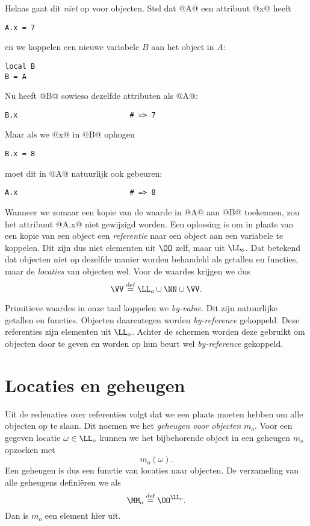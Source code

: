 Helaas gaat dit \emph{niet} op voor objecten. Stel dat @A@ een attribuut @x@ heeft
\begin{lstlisting}
A.x = 7
\end{lstlisting}
en we koppelen een nieuwe variabele $B$ aan het object in $A$:
\begin{lstlisting}
local B
B = A
\end{lstlisting}
Nu heeft @B@ sowieso dezelfde attributen als @A@:
\begin{lstlisting}
B.x                          # => 7
\end{lstlisting}
Maar als we @x@ in @B@ ophogen
\begin{lstlisting}
B.x = 8
\end{lstlisting}
moet dit in @A@ natuurlijk ook gebeuren:
\begin{lstlisting}
A.x                          # => 8
\end{lstlisting}
Wanneer we zomaar een kopie van de waarde in @A@ aan @B@ toekennen, zou het attribuut @A.x@ niet gewijzigd worden. Een oplossing is om in plaats van een kopie van een object een \emph{referentie} naar een object aan een variabele te koppelen. Dit zijn dus niet elementen uit $\OO$ zelf, maar uit $\LL_o$. Dat betekend dat objecten niet op dezelfde manier worden behandeld als getallen en functies, maar de \emph{locaties} van objecten wel. Voor de waardes krijgen we dus
\begin{equation*}
  \VV \DEF \LL_o \cup \NN \cup \VV.
\end{equation*}

Primitieve waardes in onze taal koppelen we \emph{by-value}. Dit zijn natuurlijke getallen en functies. Objecten daarentegen worden \emph{by-reference} gekoppeld. Deze referenties zijn elementen uit $\LL_o$. Achter de schermen worden deze gebruikt om objecten door te geven en worden op hun beurt wel \emph{by-reference} gekoppeld.

\section{Locaties en geheugen}\label{sec:locaties}

Uit de redenaties over referenties volgt dat we een plaats moeten hebben om alle objecten op te slaan. Dit noemen we het \emph{geheugen voor objecten} $m_o$. Voor een gegeven locatie $\omega\in\LL_o$ kunnen we het bijbehorende object in een geheugen $m_o$ opzoeken met
\begin{equation*}
  m_o(\omega).
\end{equation*}
Een geheugen is dus een functie van locaties naar objecten. De verzameling van alle geheugens definiëren we als
\begin{equation*}
  \MM_o \DEF \OO^{\LL_o}.
\end{equation*}
Dan is $m_o$ een element hier uit.

